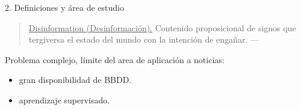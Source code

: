 \begin{frame}{2. Definiciones y área de estudio}







\begin{quotation}
    \underline{Disinformation (Desinformación).} Contenido proposicional de signos que tergiversa el estado del mundo con la intención de engañar. --- \citep{Khan2021}   
\end{quotation}

\vspace{2ex}

Problema complejo, límite del area de aplicación a noticias:
\begin{itemize}
    \item \underline{} gran disponibilidad de BBDD.
    \item \underline{} aprendizaje supervisado.
\end{itemize}


\end{frame}